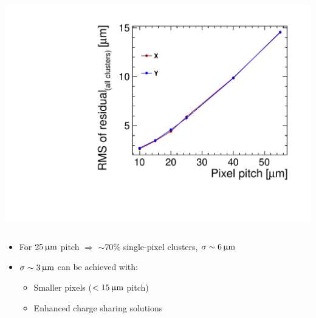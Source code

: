\begin{frame}
\begin{columns}
    \centering
    \includegraphics[width=\textwidth]{figures/extrapolation_resolution.pdf}
  \end{columns}

  \begin{itemize}
  \item For $25\,\upmu\mathrm{m}$ pitch $\Rightarrow$ $\sim70\%$ single-pixel
    clusters, $\sigma\sim6\,\upmu\mathrm{m}$
  \item $\sigma\sim3\,\upmu\mathrm{m}$ can be achieved with:
    \begin{itemize} 
    \item Smaller pixels
      ($<15\,\upmu\mathrm{m}$ pitch)
    \item Enhanced charge sharing solutions
    \end{itemize}
  \end{itemize}

\end{frame}



